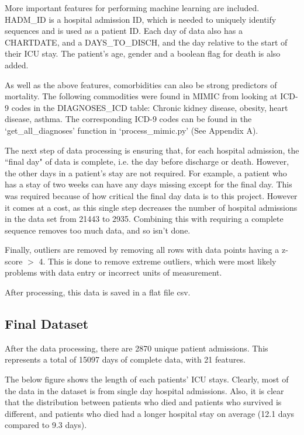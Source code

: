 \documentclass[12pt]{article}
\begin{document}
More important features for performing machine learning are included. HADM\_ID is a hospital admission ID, which is needed to uniquely identify sequences and is used as a patient ID. Each day of data also has a CHARTDATE, and a DAYS\_TO\_DISCH, and the day relative to the start of their ICU stay. The patient's age, gender and a boolean flag for death is also added.

As well as the above features, comorbidities can also be strong predictors of mortality. The following commodities were found in MIMIC from looking at ICD-9 codes in the DIAGNOSES\_ICD table: Chronic kidney disease, obesity, heart disease, asthma. The corresponding ICD-9 codes can be found in the `get\_all\_diagnoses' function in `process\_mimic.py' (See Appendix A). 

The next step of data processing is ensuring that, for each hospital admission, the ``final day" of data is complete, i.e. the day before discharge or death. However, the other days in a patient's stay are not required. For example, a patient who has a stay of two weeks can have any days missing except for the final day. This was required because of how critical the final day data is to this project. However it comes at a cost, as this single step decreases the number of hospital admissions in the data set from 21443 to 2935. Combining this with requiring a complete sequence removes too much data, and so isn't done. 

Finally, outliers are removed by removing all rows with data points having a z-score $>$ 4. This is done to remove extreme outliers, which were most likely problems with data entry or incorrect units of measurement.

After processing, this data is saved in a flat file csv. 

\subsection{Final Dataset}

After the data processing, there are 2870 unique patient admissions. This represents a total of 15097 days of complete data, with 21 features.

The below figure shows the length of each patients' ICU stays. Clearly, most of the data in the dataset is from single day hospital admissions. Also, it is clear that the distribution between patients who died and patients who survived is different, and patients who died had a longer hospital stay on average (12.1 days compared to  9.3 days).
\end{document}
